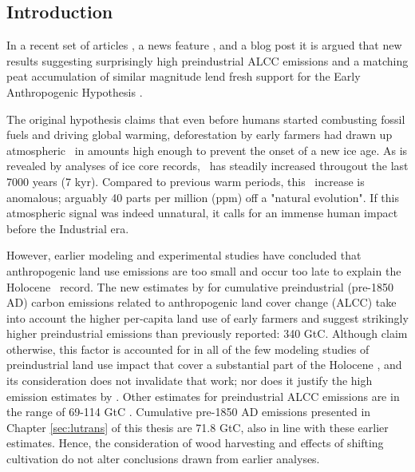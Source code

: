 
\subsection*{Introduction}
In a recent set of articles \citep{ruddiman11hol}, a news feature \citet{eah_naturenews}, and a blog post \citep{eah_realclimate} it is argued that new results suggesting surprisingly high preindustrial ALCC emissions \citep{kaplan09} and a matching peat accumulation of similar magnitude \citep{yu11hol} lend fresh support for the Early Anthropogenic Hypothesis \citep{ruddiman03cc}. 

The original hypothesis claims that even before humans started combusting fossil fuels and driving global warming, deforestation by early farmers had drawn up atmospheric \coo\ in amounts high enough to prevent the onset of a new ice age. As is revealed by analyses of ice core records, \coo\ has steadily increased througout the last 7000 years (7 kyr). Compared to previous warm periods, this \coo\ increase is anomalous; arguably 40 parts per million (ppm) off a "natural evolution". If this atmospheric signal was indeed unnatural, it calls for an immense human impact before the Industrial era. 

However, earlier modeling \citep{strassmann08tel, olofssonhickler2008, pongratz09, stocker11bg} and experimental \citep{elsig} studies have concluded that anthropogenic land use emissions are too small and occur too late to explain the Holocene \coo\ record. The new estimates by \citet{kaplan09} for cumulative preindustrial (pre-1850 AD) carbon emissions related to anthropogenic land cover change (ALCC) take into account the higher per-capita land use of early farmers and suggest strikingly higher preindustrial emissions than previously reported: 340 GtC. Although \citet{ruddiman11hol} claim otherwise, this factor is accounted for in all of the few modeling studies of preindustrial land use impact that cover a substantial part of the Holocene \citep{olofssonhickler2008, stocker11bg}, and its consideration does not invalidate that work; nor does it justify the high emission estimates by \citet{kaplan11}. Other estimates for preindustrial ALCC emissions are in the range of  69-114 GtC \citep{olofssonhickler2008, strassmann08tel, pongratz09, stocker11bg}. Cumulative pre-1850 AD emissions presented in Chapter \ref{sec:lutrans} of this thesis are 71.8 GtC, also in line with these earlier estimates. Hence, the consideration of wood harvesting and effects of shifting cultivation do not alter conclusions drawn from earlier analyses.


